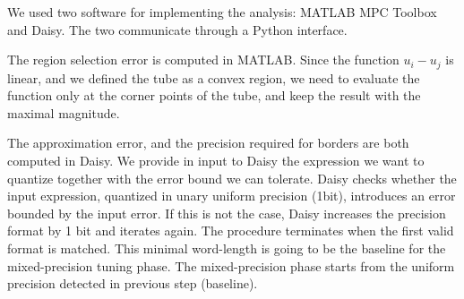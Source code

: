We used two software for implementing the analysis: MATLAB MPC Toolbox and Daisy. The two communicate through a Python interface.

The region selection error is computed in MATLAB. Since the function $u_{i}-u_{j}$ is linear, and we defined the tube as a convex region, we need to evaluate the function only at the corner points of the tube, and keep the result with the maximal magnitude.

The approximation error, and the precision required for borders are both computed in Daisy. 
We provide in input to Daisy the expression we want to quantize together with the error bound we can tolerate. Daisy checks whether the input expression, quantized in unary uniform precision (1bit), introduces an error bounded by the input error. If this is not the case, Daisy increases the precision format by 1 bit and iterates again. The procedure terminates when the first valid format is matched. This minimal word-length is going to be the baseline for the mixed-precision tuning phase.
The mixed-precision phase starts from the uniform precision detected in previous step (baseline).

